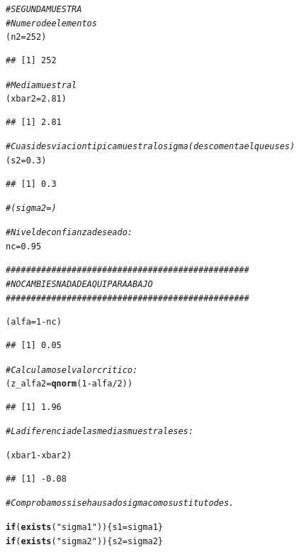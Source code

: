\documentclass[10pt,a4paper]{article}\usepackage[]{graphicx}\usepackage[]{color}
\makeatletter
\newcommand{\hlnum}[1]{\textcolor[rgb]{0.686,0.059,0.569}{#1}}%
\newcommand{\hlstr}[1]{\textcolor[rgb]{0.192,0.494,0.8}{#1}}%
\newcommand{\hlcom}[1]{\textcolor[rgb]{0.678,0.584,0.686}{\textit{#1}}}%
\newcommand{\hlopt}[1]{\textcolor[rgb]{0,0,0}{#1}}%
\newcommand{\hlstd}[1]{\textcolor[rgb]{0.345,0.345,0.345}{#1}}%
\newcommand{\hlkwa}[1]{\textcolor[rgb]{0.161,0.373,0.58}{\textbf{#1}}}%
\newcommand{\hlkwb}[1]{\textcolor[rgb]{0.69,0.353,0.396}{#1}}%
\newcommand{\hlkwd}[1]{\textcolor[rgb]{0.737,0.353,0.396}{\textbf{#1}}}%
\newenvironment{kframe}{%
 \def\at@end@of@kframe{}%
 \ifinner\ifhmode%
  \def\at@end@of@kframe{\end{minipage}}%
  \begin{minipage}{\columnwidth}%
 \fi\fi%
 \def\FrameCommand##1{\hskip\@totalleftmargin \hskip-\fboxsep
 \colorbox{shadecolor}{##1}\hskip-\fboxsep
     \hskip-\linewidth \hskip-\@totalleftmargin \hskip\columnwidth}%
 \MakeFramed {\advance\hsize-\width
   \@totalleftmargin\z@ \linewidth\hsize
   \@setminipage}}%
 {\par\unskip\endMakeFramed%
 \at@end@of@kframe}
\newenvironment{knitrout}{}{} %
\makeatother
\begin{document}
{\begin{enumerate}
\begin{knitrout}
\begin{kframe}
\begin{alltt}
    \hlcom{# SEGUNDA MUESTRA}
    \hlcom{# Numero de elementos}
    \hlstd{(n2} \hlkwb{=} \hlnum{252}\hlstd{)}
\end{alltt}
\begin{verbatim}
## [1] 252
\end{verbatim}
\begin{alltt}
    \hlcom{# Media muestral}
    \hlstd{(xbar2} \hlkwb{=} \hlnum{2.81}\hlstd{)}
\end{alltt}
\begin{verbatim}
## [1] 2.81
\end{verbatim}
\begin{alltt}
    \hlcom{# Cuasidesviacion tipica muestral o sigma (descomenta el que uses)}
    \hlstd{(s2} \hlkwb{=} \hlnum{0.3}\hlstd{)}
\end{alltt}
\begin{verbatim}
## [1] 0.3
\end{verbatim}
\begin{alltt}
    \hlcom{#(sigma2 = )}

    \hlcom{# Nivel de confianza deseado:}
    \hlstd{nc} \hlkwb{=} \hlnum{0.95}

    \hlcom{################################################}
    \hlcom{#NO CAMBIES NADA DE AQUI PARA ABAJO}
    \hlcom{################################################}

    \hlstd{(alfa} \hlkwb{=} \hlnum{1} \hlopt{-} \hlstd{nc)}
\end{alltt}
\begin{verbatim}
## [1] 0.05
\end{verbatim}
\begin{alltt}
    \hlcom{# Calculamos el valor critico:}
    \hlstd{(z_alfa2} \hlkwb{=} \hlkwd{qnorm}\hlstd{(} \hlnum{1} \hlopt{-} \hlstd{alfa} \hlopt{/} \hlnum{2}\hlstd{))}
\end{alltt}
\begin{verbatim}
## [1] 1.96
\end{verbatim}
\begin{alltt}
    \hlcom{# La diferencia de las medias muestrales es:}

    \hlstd{(xbar1} \hlopt{-} \hlstd{xbar2)}
\end{alltt}
\begin{verbatim}
## [1] -0.08
\end{verbatim}
\begin{alltt}
    \hlcom{# Comprobamos si se ha usado sigma como sustituto de s.}

    \hlkwa{if}\hlstd{(}\hlkwd{exists}\hlstd{(}\hlstr{"sigma1"}\hlstd{))\{s1} \hlkwb{=} \hlstd{sigma1\}}
    \hlkwa{if}\hlstd{(}\hlkwd{exists}\hlstd{(}\hlstr{"sigma2"}\hlstd{))\{s2} \hlkwb{=} \hlstd{sigma2\}}


\end{alltt}
\end{kframe}
\end{knitrout}
\end{enumerate}}
\end{document}
